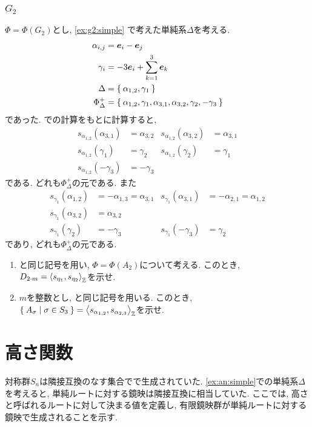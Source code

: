 \subsection{$G_2$}
\label{ex:g2:action}
$\Phi=\Phi(G_2)$とし,
\cref{ex:g2:simple}
で考えた単純系$\Delta$を考える.
\begin{align*}
  \alpha_{i,j}&=\boldsymbol{e}_i-\boldsymbol{e}_j\\
  \gamma_{i}&=-3\boldsymbol{e}_i+\sum_{k=1}^{3}\boldsymbol{e}_k\\
  \Delta&=\Set{\alpha_{1,2},\gamma_{1}}\\
  \Phi_\Delta^+ 
&=\Set{ \alpha_{1,2},\gamma_{1}, \alpha_{3,1},\alpha_{3,2},\gamma_{2},-\gamma_3}
\end{align*}
であった. での計算をもとに計算すると,
\begin{align*}
s_{\alpha_{1,2}}(\alpha_{3,1})&=\alpha_{3,2}
&s_{\alpha_{1,2}}(\alpha_{3,2})&=\alpha_{3,1}\\
s_{\alpha_{1,2}}(\gamma_1)&=\gamma_{2}&
s_{\alpha_{1,2}}(\gamma_2)&=\gamma_{1}\\
s_{\alpha_{1,2}}(-\gamma_3)&=-\gamma_{3}&
\end{align*}
である.  どれも$\Phi_\Delta^+$の元である.
また
\begin{align*}
  s_{\gamma_{1}}(\alpha_{1,2})&=-\alpha_{1,3}=\alpha_{3,1}
&s_{\gamma_{1}}(\alpha_{3,1})&=-\alpha_{2,1}=\alpha_{1,2}\\
s_{\gamma_{1}}(\alpha_{3,2})&=\alpha_{3,2}\\
s_{\gamma_{1}}(\gamma_2)&=-\gamma_{3}&
s_{\gamma_{1}}(-\gamma_3)&=\gamma_{2}
\end{align*}
であり, どれも$\Phi_\Delta^+$の元である.

\begin{enumerate}
\item
  と同じ記号を用い,
  $\Phi=\Phi(A_{2})$について考える.
  このとき,
  $D_{2\cdot m}=\Braket{s_{\eta_1},s_{\eta_2}}_{\mathbb{Z}}$を示せ.
\item
  $m$を整数とし,
  と同じ記号を用いる.
  このとき,
  $\Set{A_\sigma|\sigma\in S_3}=\Braket{s_{\alpha_{1,2}},s_{\alpha_{2,3}}}_{\mathbb{Z}}$を示せ.
\end{enumerate}

\chapter{高さ関数}

対称群$S_n$は隣接互換のなす集合でで生成されていた.
\cref{ex:an:simple}での単純系$\Delta$を考えると,
単純ルートに対する鏡映は隣接互換に相当していた.
ここでは,
高さと呼ばれるルートに対して決まる値を定義し,
有限鏡映群が単純ルートに対する鏡映で生成されることを示す.


